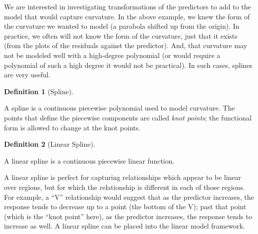 \documentclass[
  letterpaper,
  DIV=11,
  numbers=noendperiod]{scrreprt}
\theoremstyle{definition}
\theoremstyle{definition}
\newtheorem{definition}{Definition}[chapter]
\theoremstyle{remark}
\begin{document}
We are interested in investigating transformations of the predictors to
add to the model that would capture curvature. In the above example, we
knew the form of the curvature we wanted to model (a parabola shifted up
from the origin). In practice, we often will not know the form of the
curvature, just that it exists (from the plots of the residuals against
the predictor). And, that curvature may not be modeled well with a
high-degree polynomial (or would require a polynomial of such a high
degree it would not be practical). In such cases, splines are very
useful.

\begin{definition}[Spline]\protect\hypertarget{def-spline}{}\label{def-spline}

A spline is a continuous piecewise polynomial used to model curvature.
The points that define the piecewise components are called \emph{knot
points}; the functional form is allowed to change at the knot points.

\end{definition}

\begin{definition}[Linear
Spline]\protect\hypertarget{def-linear-spline}{}\label{def-linear-spline}

A linear spline is a continuous piecewise linear function.

\end{definition}

A linear spline is perfect for capturing relationships which appear to
be linear over regions, but for which the relationship is different in
each of those regions. For example, a ``V'' relationship would suggest
that as the predictor increases, the response tends to decrease up to a
point (the bottom of the V); past that point (which is the ``knot
point'' here), as the predictor increases, the response tends to
increase as well. A linear spline can be placed into the linear model
framework.
\end{document}
